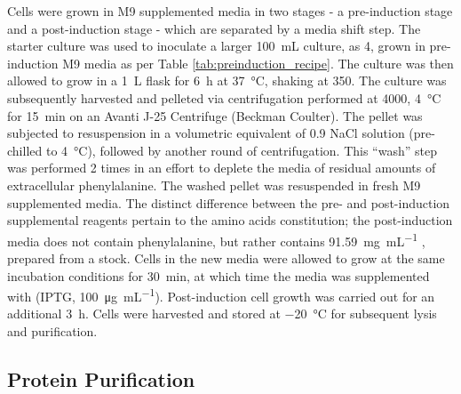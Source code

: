 \begin{refsection}
Cells were grown in M9 supplemented media in two stages - a pre-induction stage
and a post-induction stage - which are separated by a media shift step.  The
starter culture was used to inoculate a larger \SI{100}{\mL} culture, as
\SI{4}{\volper}, grown in pre-induction M9 media as per Table
\ref{tab:preinduction_recipe}.  The culture was then allowed to grow in a
\SI{1}{\L} flask for \SI{6}{\hour} at \SI{37}{\celsius}, shaking at
\SI{350}{\rpm}. The culture was subsequently harvested and pelleted via
centrifugation performed at \SI{4000}{\gforce}, \SI{4}{\celsius} for
\SI{15}{\minute} on an Avanti J-25 Centrifuge (Beckman Coulter). The pellet was
subjected to resuspension in a volumetric equivalent of \SI{0.9}{\wtper} NaCl
solution (pre-chilled to \SI{4}{\celsius}), followed by another round of
centrifugation.  This ``wash'' step was performed 2 times in an effort to
deplete the media of residual amounts of extracellular phenylalanine. The washed
pellet was resuspended in fresh M9 supplemented media.  The distinct difference
between the pre- and post-induction supplemental reagents pertain to the amino
acids constitution; the post-induction media does not contain phenylalanine, but
rather contains \SI{91.59}{\mg\per\mL} ,
prepared from a stock.  Cells in the new media were allowed to grow at the same
incubation conditions for \SI{30}{\minute}, at which time the media was
supplemented with  (IPTG,
\SI{100}{\ug\per\mL}). Post-induction cell growth was carried out for an
additional \SI{3}{\hour}. Cells were harvested and stored at \SI{-20}{\celsius}
for subsequent lysis and purification.

\subsection{Protein Purification}


\end{refsection}
